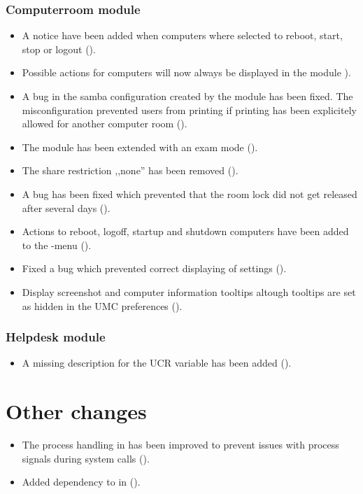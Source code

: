\subsubsection{Computerroom module}
\begin{itemize}
\item A notice have been added when computers where selected to reboot, start, stop or logout ().
\item Possible actions for computers will now always be displayed in the  module ).
\item A bug in the samba configuration created by the  module has been fixed. The
  misconfiguration prevented users from printing if printing has been explicitely allowed for another computer
  room ().
\item The  module has been extended with an exam mode ().
\item The share restriction ,,none'' has been removed ().
\item A bug has been fixed which prevented that the room lock did not get released after several days ().
\item Actions to reboot, logoff, startup and shutdown computers have been added to the -menu ().
\item Fixed a bug which prevented correct displaying of  settings ().
\item Display screenshot and computer information tooltips altough tooltips are set as hidden in the UMC preferences ().
\end{itemize}

\subsubsection{Helpdesk module}
\begin{itemize}
\item A missing description for the UCR variable  has been added ().
\end{itemize}


\section{Other changes}
\begin{itemize}
\item The process handling in  has been improved to prevent issues with process
  signals during system calls ().
\item Added dependency to  in  ().
\end{itemize}
